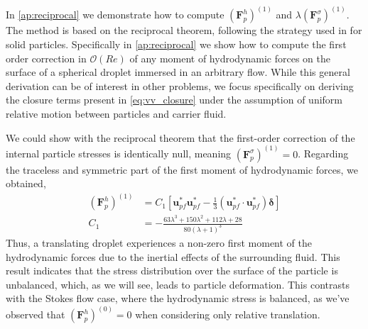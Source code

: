 In \ref{ap:reciprocal} we demonstrate how to compute $(\textbf{F}^h_p)^{(1)}$ and $\lambda (\textbf{F}^\sigma_p)^{(1)}$. 
The method is based on the reciprocal theorem, following the strategy used in \citet{stone2001inertial,masoud2019reciprocal} for solid particles. 
Specifically in \ref{ap:reciprocal} we show how to compute the first order correction in $\mathcal{O}(Re)$ of any moment of hydrodynamic forces on the surface of a spherical droplet immersed in an arbitrary flow. 
While this general derivation can be of interest in other problems, we focus specifically on deriving the closure terms present in \ref{eq:vv_closure} under the assumption of uniform relative motion between particles and carrier fluid. 


We could show with the reciprocal theorem that the first-order correction of the internal particle stresses is identically null, meaning $(\textbf{F}^\sigma_p)^{(1)} = 0$. 
Regarding the traceless and symmetric part of the first moment of hydrodynamic forces, we obtained, 
\begin{align}
    (\textbf{F}^h_p)^{(1)}  
    &=
    C_1 
    [
        \textbf{u}_{pf}^*\textbf{u}_{pf}^* - \frac{1}{3}(\textbf{u}_{pf}^*\cdot \textbf{u}_{pf}^*)\bm\delta 
    ]\\
    C_1 &=
    - \frac{63 \lambda^{3} + 150 \lambda^{2} + 112 \lambda + 28}{80 \left(\lambda + 1\right)^{3}}
    \label{eq:closure_sigma_e}
\end{align}
Thus, a translating droplet experiences a non-zero first moment of the hydrodynamic forces due to the inertial effects of the surrounding fluid. This result indicates that the stress distribution over the surface of the particle is unbalanced, which, as we will see, leads to particle deformation.
This contrasts with the Stokes flow case, where the hydrodynamic stress is balanced, as we've observed that $(\textbf{F}^h_p)^{(0)} = 0$ when considering only relative translation.  


